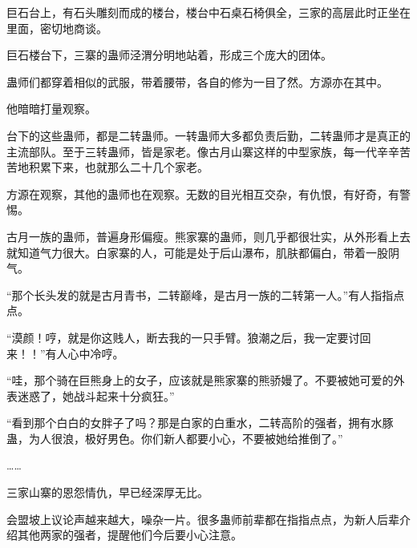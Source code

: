 \begin{this_body}
巨石台上，有石头雕刻而成的楼台，楼台中石桌石椅俱全，三家的高层此时正坐在里面，密切地商谈。

巨石楼台下，三寨的蛊师泾渭分明地站着，形成三个庞大的团体。

蛊师们都穿着相似的武服，带着腰带，各自的修为一目了然。方源亦在其中。

他暗暗打量观察。

台下的这些蛊师，都是二转蛊师。一转蛊师大多都负责后勤，二转蛊师才是真正的主流部队。至于三转蛊师，皆是家老。像古月山寨这样的中型家族，每一代辛辛苦苦地积累下来，也就那么二十几个家老。

方源在观察，其他的蛊师也在观察。无数的目光相互交杂，有仇恨，有好奇，有警惕。

古月一族的蛊师，普遍身形偏瘦。熊家寨的蛊师，则几乎都很壮实，从外形看上去就知道气力很大。白家寨的人，可能是处于后山瀑布，肌肤都偏白，带着一股阴气。

“那个长头发的就是古月青书，二转巅峰，是古月一族的二转第一人。”有人指指点点。

“漠颜！哼，就是你这贱人，断去我的一只手臂。狼潮之后，我一定要讨回来！！”有人心中冷哼。

“哇，那个骑在巨熊身上的女子，应该就是熊家寨的熊骄嫚了。不要被她可爱的外表迷惑了，她战斗起来十分疯狂。”

“看到那个白白的女胖子了吗？那是白家的白重水，二转高阶的强者，拥有水豚蛊，为人很浪，极好男色。你们新人都要小心，不要被她给推倒了。”

……

三家山寨的恩怨情仇，早已经深厚无比。

会盟坡上议论声越来越大，噪杂一片。很多蛊师前辈都在指指点点，为新人后辈介绍其他两家的强者，提醒他们今后要小心注意。

\end{this_body}


